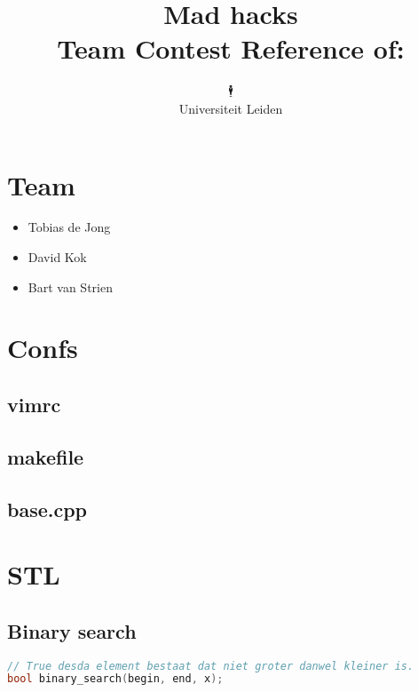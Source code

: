 \documentclass[10pt,hidelinks]{article}
\title{Mad hacks\\[1cm]
\small{Team Contest Reference of:}}
\author{{\fontspec{Symbola}🕴}\\[1cm]
	\small{Universiteit Leiden}}
\begin{document}
\fontsize{10}{12}


\maketitle

\newpage

\tableofcontents

\section{Team}
\begin{itemize}
\item Tobias de Jong
\item David Kok
\item Bart van Strien
\end{itemize}

\pagebreak

\section{Confs}

\subsection{vimrc}


\subsection{makefile}


\lstset{language=c++}

\subsection{base.cpp}


\pagebreak

\section{STL}

\subsection{Binary search}

\begin{lstlisting}[language=c++]
// True desda element bestaat dat niet groter danwel kleiner is.
bool binary_search(begin, end, x);
\end{lstlisting}
\end{document}
